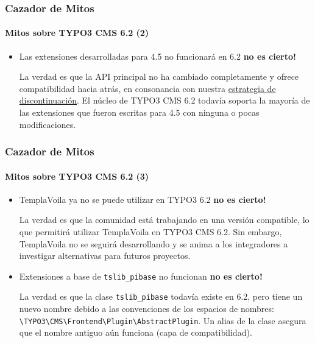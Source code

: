 
\begin{frame}[fragile]
	\frametitle{Cazador de Mitos}
	\framesubtitle{Mitos sobre TYPO3 CMS 6.2 (2)}

	\begin{itemize}
		\item Las extensiones desarrolladas para 4.5 no funcionará en 6.2\newline
			\tabto{8.4cm}\color{red}\textbf{\textrightarrow no es cierto!}\color{black}

			\smaller
				La verdad es que la API principal no ha cambiado completamente y ofrece compatibilidad hacia atrás, en consonancia con nuestra \href{http://forge.typo3.org/projects/typo3v4-core/wiki/CoreDevPolicy}{estrategia de discontinuación}. El núcleo de TYPO3 CMS 6.2 todavía soporta la mayoría de las extensiones que fueron escritas para 4.5 con ninguna o pocas modificaciones.
	\end{itemize}

\end{frame}


\begin{frame}[fragile]
	\frametitle{Cazador de Mitos}
	\framesubtitle{Mitos sobre TYPO3 CMS 6.2 (3)}

	\begin{itemize}
		\item TemplaVoila ya no se puede utilizar en TYPO3 6.2\newline
			\tabto{8.4cm}\color{red}\textbf{\textrightarrow no es cierto!}\color{black}

			\smaller
				La verdad es que la comunidad está trabajando en una versión compatible, lo que permitirá utilizar TemplaVoila en TYPO3 CMS 6.2. Sin embargo, TemplaVoila no se seguirá desarrollando y se anima a los integradores a investigar alternativas para futuros proyectos.
			\normalsize

		\item Extensiones a base de \texttt{tslib\_pibase} no funcionan\newline
			\tabto{8.4cm}\color{red}\textbf{\textrightarrow no es cierto!}\color{black}

			\smaller
				La verdad es que la clase \texttt{tslib\_pibase} todavía existe en 6.2, pero tiene un nuevo nombre debido a las convenciones de los espacios de nombres: \texttt{\textbackslash TYPO3\textbackslash CMS\textbackslash Frontend\textbackslash Plugin\textbackslash AbstractPlugin}.\newline
				Un alias de la clase asegura que el nombre antiguo aún funciona (capa de compatibilidad).
	\end{itemize}

\end{frame}


